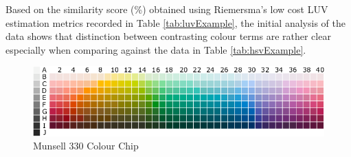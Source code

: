 Based on the similarity score (\%) obtained using Riemersma's low cost LUV estimation metrics recorded in Table \ref{tab:luvExample}, the initial analysis of the data shows that distinction between contrasting colour terms are rather clear especially when comparing against the data in Table \ref{tab:hsvExample}.




\begin{figure}[hbt!]\centering
\includegraphics[width=.9\textwidth]{image/analysis/munsell_o.png}
\caption{Munsell 330 Colour Chip}
\label{fig:munsell_ori330}
\end{figure}

